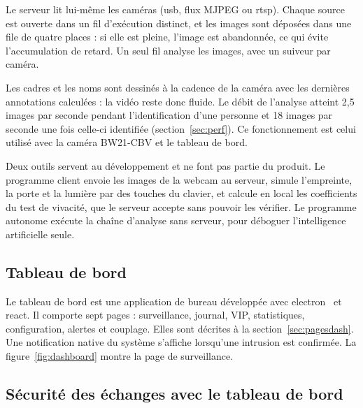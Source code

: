 Le serveur lit lui-même les caméras (\gls{usb}, flux MJPEG ou \gls{rtsp}). Chaque source est ouverte dans un fil d'exécution distinct, et les images sont déposées dans une file de quatre places : si elle est pleine, l'image est abandonnée, ce qui évite l'accumulation de retard. Un seul fil analyse les images, avec un suiveur par caméra. \begin{maj}
Les cadres et les noms sont dessinés à la cadence de la caméra avec les dernières annotations calculées : la vidéo reste donc fluide. Le débit de l'analyse atteint 2,5 images par seconde pendant l'identification d'une personne et 18 images par seconde une fois celle-ci identifiée (section~\ref{sec:perf}). Ce fonctionnement est celui utilisé avec la caméra BW21-CBV et le tableau de bord.
\end{maj}

Deux outils servent au développement et ne font pas partie du produit. Le programme client envoie les images de la webcam au serveur, simule l'empreinte, la porte et la lumière par des touches du clavier, et calcule en local les coefficients du test de vivacité, que le serveur accepte sans pouvoir les vérifier. Le programme autonome exécute la chaîne d'analyse sans serveur, pour déboguer l'intelligence artificielle seule.

\subsection{Tableau de bord}

\begin{maj}
Le tableau de bord est une application de bureau développée avec \gls{electron}~\cite{electron_docs} et \gls{react}. Il comporte sept pages : surveillance, journal, VIP, statistiques, configuration, alertes et couplage. Elles sont décrites à la section~\ref{sec:pagesdash}. Une notification native du système s'affiche lorsqu'une intrusion est confirmée. La figure~\ref{fig:dashboard} montre la page de surveillance.
\end{maj}


\subsection{Sécurité des échanges avec le tableau de bord}\label{sec:couplage}

